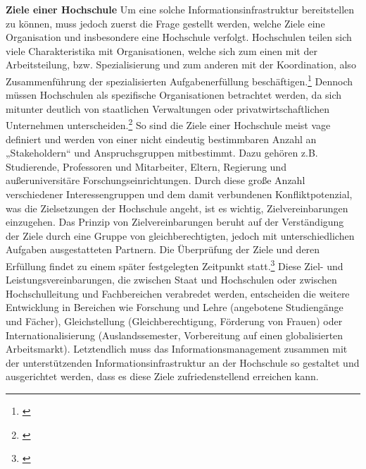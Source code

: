 \textbf{Ziele einer Hochschule}
Um eine solche Informationsinfrastruktur bereitstellen zu können, muss jedoch zuerst die Frage gestellt werden, welche Ziele eine Organisation und insbesondere eine Hochschule verfolgt.
Hochschulen teilen sich viele Charakteristika mit Organisationen, welche sich zum einen mit der Arbeitsteilung, bzw. Spezialisierung und zum anderen mit der Koordination, also  Zusammenführung der spezialisierten Aufgabenerfüllung beschäftigen.\footnote{\cite{groschla_organisationstheorie_1978}} Dennoch müssen Hochschulen als spezifische Organisationen betrachtet werden, da sich mitunter deutlich von staatlichen Verwaltungen oder privatwirtschaftlichen Unternehmen unterscheiden.\footnote{\cite[603-614]{müller-böling_betriebswirtschaft_1999}}
So sind die Ziele einer Hochschule meist vage definiert und werden von einer nicht eindeutig bestimmbaren Anzahl an „Stakeholdern“ und Anspruchsgruppen mitbestimmt. Dazu gehören z.B. Studierende, Professoren und Mitarbeiter, Eltern, Regierung und außeruniversitäre Forschungseinrichtungen.
Durch diese große Anzahl verschiedener Interessengruppen und dem damit verbundenen Konfliktpotenzial, was die Zielsetzungen der Hochschule angeht, ist es wichtig, Zielvereinbarungen einzugehen. Das Prinzip von Zielvereinbarungen beruht auf der Verständigung der Ziele durch eine Gruppe von gleichberechtigten, jedoch mit unterschiedlichen Aufgaben ausgestatteten Partnern. Die Überprüfung der Ziele und deren Erfüllung findet zu einem später festgelegten Zeitpunkt statt.\footnote{\cite{FredowitzKrasnyZiegele_zielvereinbarungen_1999}}
Diese Ziel- und Leistungsvereinbarungen, die zwischen Staat und Hochschulen oder zwischen Hochschulleitung und Fachbereichen verabredet werden, entscheiden die weitere Entwicklung in Bereichen wie Forschung und Lehre (angebotene Studiengänge und Fächer), Gleichstellung (Gleichberechtigung, Förderung von Frauen) oder Internationalisierung (Auslandssemester, Vorbereitung auf einen globalisierten Arbeitsmarkt).
Letztendlich muss das Informationsmanagement zusammen mit der unterstützenden Informationsinfrastruktur an der Hochschule so gestaltet und ausgerichtet werden, dass es diese Ziele zufriedenstellend erreichen kann. 
